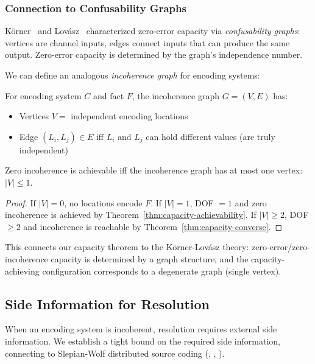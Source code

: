 \subsubsection{Connection to Confusability Graphs}

Körner~\cite{korner1973graphs} and Lovász~\cite{lovasz1979shannon} characterized zero-error capacity via \emph{confusability graphs}: vertices are channel inputs, edges connect inputs that can produce the same output. Zero-error capacity is determined by the graph's independence number.

We can define an analogous \emph{incoherence graph} for encoding systems:

\begin{definition}\label{def:incoherence-graph}
For encoding system $C$ and fact $F$, the incoherence graph $G = (V, E)$ has:
\begin{itemize}
\tightlist
\item Vertices $V = $ independent encoding locations
\item Edge $(L_i, L_j) \in E$ iff $L_i$ and $L_j$ can hold different values (are truly independent)
\end{itemize}
\end{definition}

\begin{theorem}\label{thm:incoherence-graph}
Zero incoherence is achievable iff the incoherence graph has at most one vertex: $|V| \leq 1$.
\end{theorem}

\begin{proof}
If $|V| = 0$, no locations encode $F$. If $|V| = 1$, DOF $= 1$ and zero incoherence is achieved by Theorem~\ref{thm:capacity-achievability}. If $|V| \geq 2$, DOF $\geq 2$ and incoherence is reachable by Theorem~\ref{thm:capacity-converse}.
\end{proof}

This connects our capacity theorem to the Körner-Lovász theory: zero-error/zero-incoherence capacity is determined by a graph structure, and the capacity-achieving configuration corresponds to a degenerate graph (single vertex).

\subsection{Side Information for Resolution}\label{sec:side-information}

When an encoding system is incoherent, resolution requires external side information. We establish a tight bound on the required side information, connecting to Slepian-Wolf distributed source coding (, , ).

